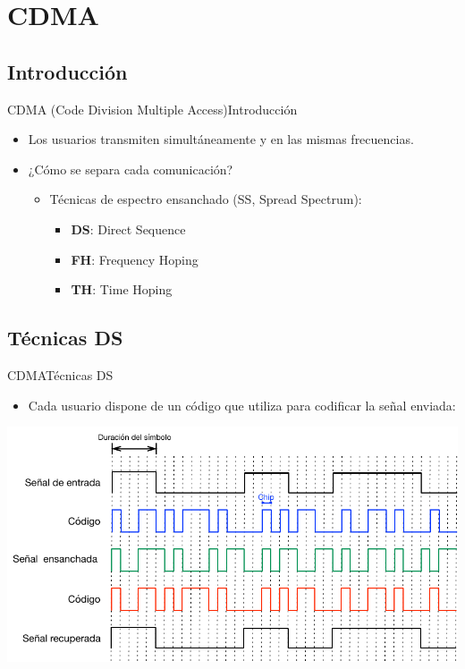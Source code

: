\documentclass[10pt,compress]{beamer} %
\begin{document}
\section{CDMA}
\subsection{Introducción}
\begin{frame}{CDMA (Code Division Multiple Access)}{Introducción}
  \begin{itemize}
    \item Los usuarios transmiten simultáneamente y en las mismas frecuencias.
    \item ¿Cómo se separa cada comunicación?
    \begin{itemize}
      \item Técnicas de espectro ensanchado (SS, Spread Spectrum):
      \begin{itemize}
        \item {\bf DS}: Direct Sequence
        \item {\bf FH}: Frequency Hoping
        \item {\bf TH}: Time Hoping
      \end{itemize}
    \end{itemize}
  \end{itemize}
\end{frame}

\subsection{Técnicas DS}
\begin{frame}{CDMA}{Técnicas DS}
  \begin{itemize}
    \item Cada usuario dispone de un código que utiliza para codificar la señal enviada:
  \end{itemize}
  \centering \includegraphics[width=0.8\linewidth]{../Apuntes/Figuras/DS-CDMA.pdf}
\end{frame}
\end{document}
